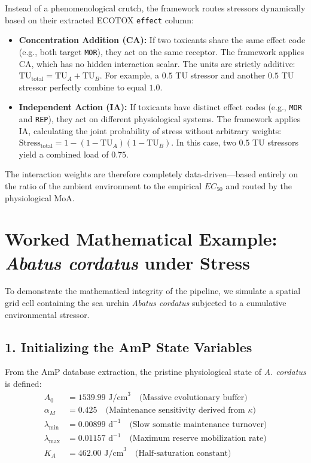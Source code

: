 \documentclass[11pt,a4paper]{article}
\begin{document}
Instead of a phenomenological crutch, the framework routes stressors dynamically based on their extracted ECOTOX \texttt{effect} column:
\begin{itemize}
    \item \textbf{Concentration Addition (CA):} If two toxicants share the same effect code (e.g., both target \texttt{MOR}), they act on the same receptor. The framework applies CA, which has no hidden interaction scalar. The units are strictly additive: $\text{TU}_{\text{total}} = \text{TU}_A + \text{TU}_B$. For example, a $0.5$ TU stressor and another $0.5$ TU stressor perfectly combine to equal $1.0$.
    \item \textbf{Independent Action (IA):} If toxicants have distinct effect codes (e.g., \texttt{MOR} and \texttt{REP}), they act on different physiological systems. The framework applies IA, calculating the joint probability of stress without arbitrary weights: $\text{Stress}_{\text{total}} = 1 - (1 - \text{TU}_A)(1 - \text{TU}_B)$. In this case, two $0.5$ TU stressors yield a combined load of $0.75$.
\end{itemize}
The interaction weights are therefore completely data-driven—based entirely on the ratio of the ambient environment to the empirical $EC_{50}$ and routed by the physiological MoA.


\section{Worked Mathematical Example: \textit{Abatus cordatus} under Stress}

To demonstrate the mathematical integrity of the pipeline, we simulate a spatial grid cell containing the sea urchin \textit{Abatus cordatus} subjected to a cumulative environmental stressor.

\subsection*{1. Initializing the AmP State Variables}
From the AmP database extraction, the pristine physiological state of \textit{A. cordatus} is defined:
\begin{align*}
    A_0 &= 1539.99 \text{ J/cm}^3 \quad \text{(Massive evolutionary buffer)} \\
    \alpha_M &= 0.425 \quad \text{(Maintenance sensitivity derived from } \kappa\text{)} \\
    \lambda_{\min} &= 0.00899 \text{ d}^{-1} \quad \text{(Slow somatic maintenance turnover)} \\
    \lambda_{\max} &= 0.01157 \text{ d}^{-1} \quad \text{(Maximum reserve mobilization rate)} \\
    K_A &= 462.00 \text{ J/cm}^3 \quad \text{(Half-saturation constant)}
\end{align*}
\end{document}
